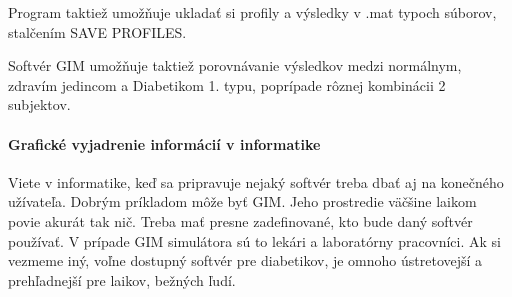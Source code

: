 Program taktiež umožňuje ukladať si profily a výsledky v .mat typoch súborov, stalčením SAVE PROFILES.\cite{2007}

Softvér GIM umožňuje taktiež porovnávanie výsledkov medzi normálnym, zdravím jedincom a Diabetikom 1. typu, poprípade rôznej kombinácii 2 subjektov.\cite{2007}

\paragraph{Grafické vyjadrenie informácií v informatike}
Viete v informatike, keď sa pripravuje nejaký softvér treba dbať aj na konečného užívateľa. Dobrým príkladom môže byť GIM. Jeho prostredie väčšine laikom povie akurát tak nič. Treba mať presne zadefinované, kto bude daný softvér používať. V prípade GIM simulátora sú to lekári a laboratórny pracovníci. Ak si vezmeme iný, voľne dostupný softvér pre diabetikov, je omnoho ústretovejší a prehľadnejší pre laikov, bežných ľudí.